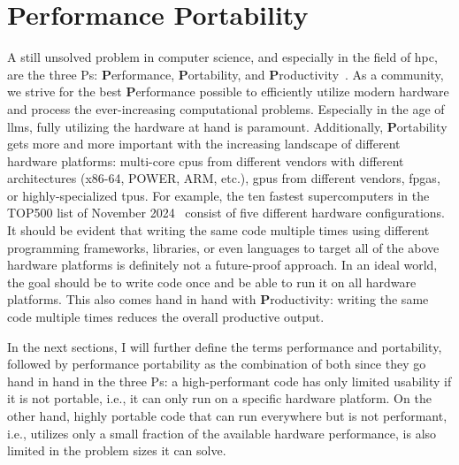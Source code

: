 \chapter{Performance Portability}
\label{chapter:pp}

A still unsolved problem in computer science, and especially in the field of \gls{hpc}, are the three Ps: \textbf{P}erformance, \textbf{P}ortability, and \textbf{P}roductivity~\cite{anzt_then_2024}. 
As a community, we strive for the best \textbf{P}erformance possible to efficiently utilize modern hardware and process the ever-increasing computational problems. 
Especially in the age of \glspl{llm}, fully utilizing the hardware at hand is paramount. 
Additionally, \textbf{P}ortability gets more and more important with the increasing landscape of different hardware platforms: multi-core \glspl{cpu} from different vendors with different architectures (x86-64, POWER, ARM, etc.), \glspl{gpu} from different vendors, \glspl{fpga}, or highly-specialized \glspl{tpu}. 
For example, the ten fastest supercomputers in the TOP500 list of November 2024~\cite{top500org_november_2024} consist of five different hardware configurations. 
It should be evident that writing the same code multiple times using different programming frameworks, libraries, or even languages to target all of the above hardware platforms is definitely not a future-proof approach. 
In an ideal world, the goal should be to write code once and be able to run it on all hardware platforms. 
This also comes hand in hand with \textbf{P}roductivity: writing the same code multiple times reduces the overall productive output. 

In the next sections, I will further define the terms performance and portability, followed by performance portability as the combination of both since they go hand in hand in the three Ps: a high-performant code has only limited usability if it is not portable, i.e., it can only run on a specific hardware platform. 
On the other hand, highly portable code that can run everywhere but is not performant, i.e., utilizes only a small fraction of the available hardware performance, is also limited in the problem sizes it can solve.  

